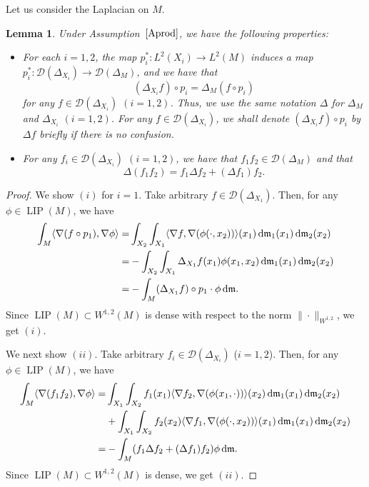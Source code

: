 \documentclass[pdftex]{sigma}
\numberwithin{equation}{section}
\newtheorem{Lem}[Thm]{Lemma}
\theoremstyle{definition}
\newcommand{\LIP}{\operatorname{LIP}}
\newcommand{\mf}{\mathfrak{m}}
\newcommand{\D}{\mathcal{D}}
\begin{document}
Let us consider the Laplacian on $M$.
\begin{Lem}\label{Laprod}
Under Assumption~$\ref{Aprod}$, we have the following properties:
\begin{itemize}\itemsep=0pt
\item[$(i)$] For each $i=1,2$, the map $p_i^\ast\colon L^2(X_i)\to L^2(M)$ induces a map $p_i^\ast \colon \D(\Delta_{X_i})\to \D(\Delta_M)$, and we have that
\[
(\Delta_{X_i}f)\circ p_i=\Delta_M(f\circ p_i)
\]
for any $f\in \D(\Delta_{X_i})$ $(i=1,2)$.
Thus, we use the same notation $\Delta$ for $\Delta_M$ and $\Delta_{X_i}$ $(i=1,2)$.
For any $f\in \D(\Delta_{X_i})$, we shall denote $(\Delta_{X_i} f)\circ p_i$ by $\Delta f$ briefly if there is no confusion.
\item[$(ii)$] For any $f_i\in\D(\Delta_{X_i})$ $(i=1,2)$, we have that $f_1 f_2\in\D(\Delta_M)$ and that
\[
\Delta(f_1 f_2)=f_1\Delta f_2+(\Delta f_1) f_2.
\]
\end{itemize}
\end{Lem}
\begin{proof}
We show $(i)$ for $i=1$.
Take arbitrary $f\in \D(\Delta_{X_1})$.
Then, for any $\phi\in \LIP(M)$, we have
\begin{align*}
\int_M\langle\nabla (f\circ p_1),\nabla\phi\rangle
=&\int_{X_2}\int_{X_1}\langle\nabla f,\nabla (\phi(\cdot,x_2))\rangle(x_1)\,{\rm d}\mf_1(x_1)\,{\rm d}\mf_2(x_2)\\
=&-\int_{X_2}\int_{X_1} \Delta_{X_1} f(x_1)\phi(x_1,x_2)\,{\rm d}\mf_1(x_1)\,{\rm d}\mf_2(x_2)\\
=&-\int_M (\Delta_{X_1} f)\circ p_1 \cdot \phi \,{\rm d}\mf .
\end{align*}
Since $\LIP(M)\subset W^{1,2}(M)$ is dense with respect to the norm $\|\cdot\|_{W^{1,2}}$, we get $(i)$.

We next show $(ii)$.
Take arbitrary $f_i\in\D(\Delta_{X_i})$ ($i=1,2$).
Then, for any $\phi\in\LIP(M)$, we have
\begin{align*}
\int_M\langle\nabla (f_1 f_2),\nabla\phi\rangle=&\int_{X_1}\int_{X_2}f_1(x_1)\langle\nabla f_2,\nabla (\phi(x_1,\cdot))\rangle(x_2)\,{\rm d}\mf_1(x_1)\,{\rm d}\mf_2(x_2)
\\
&{}+ \int_{X_1}\int_{X_2}f_2(x_2)\langle\nabla f_1,\nabla (\phi(\cdot, x_2))\rangle(x_1)\,{\rm d}\mf_1(x_1)\,{\rm d}\mf_2(x_2)
\\
=&-\int_M (f_1\Delta f_2+(\Delta f_1)f_2) \phi \,{\rm d}\mf.
\end{align*}
Since $\LIP(M)\subset W^{1,2}(M)$ is dense, we get $(ii)$.
\end{proof}
\end{document}
